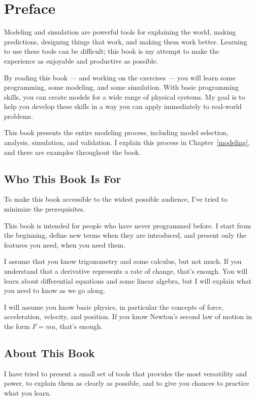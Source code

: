 \chapter*{Preface}
\adjustmtc

Modeling and simulation are powerful tools for explaining the world, making predictions, designing things that work, and making them work better.  Learning to use these tools can be difficult; this book is my attempt to make the experience as enjoyable and productive as possible.

By reading this book --- and working on the exercises --- you will learn some programming, some modeling, and some simulation.
With basic programming skills, you can create models for a wide range of physical systems.
My goal is to help you develop these skills in a way you can apply immediately to real-world problems.

This book presents the entire modeling process, including model selection, analysis, simulation, and validation.  I explain this process in Chapter~\ref{modeling}, and there are examples throughout the book.

\section{Who This Book Is For}

To make this book accessible to the widest possible audience, I've tried to minimize the prerequisites.

This book is intended for people who have never programmed before.  I start from the beginning, define new terms when they are introduced, and present only the features you need, when you need them.

I assume that you know trigonometry and some calculus, but not much.  If you understand that a derivative represents a rate of change, that's enough.  You will learn about differential equations and some linear algebra, but I will explain what you need to know as we go along.

I will assume you know basic physics, in particular the concepts of force, acceleration, velocity, and position.  If you know Newton's second law of motion in the form $F = m a$, that's enough.

\section{About This Book}

I have tried to present a small set of tools that provides the most versatility and power, to explain them as clearly as possible, and to give you chances to practice what you learn.

